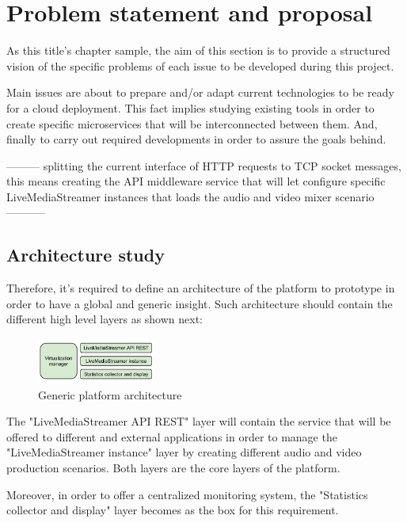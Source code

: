 \chapter{Problem statement and proposal}\label{B:problemStatementAndProposal}

As this title's chapter sample, the aim of this section is to provide a structured vision of the specific problems of each issue to be developed during this project.

Main issues are about to prepare and/or adapt current technologies to be ready for a cloud deployment. This fact implies studying existing tools in order to create specific microservices that will be interconnected between them. And, finally to carry out required developments in order to assure the goals behind.

--------- splitting the current interface of HTTP requests to TCP socket messages, this means creating the API middleware service that will let configure specific LiveMediaStreamer instances  that loads the audio and video mixer scenario-----------

\section{Architecture study}

Therefore, it's required to define an architecture of the platform to prototype in order to have a global and generic insight. Such architecture should contain the different high level layers as shown next:
\begin{figure}[htb]
\begin{center}
\includegraphics[width=0.35\textwidth]{./images/generalArch.png}
\caption{Generic platform architecture}
\label{F:genericPlatArch}
\end{center}
\end{figure}

The "LiveMediaStreamer API REST" layer will contain the service that will be offered to different and external applications in order to manage the "LiveMediaStreamer instance" layer by creating different audio and video production scenarios. Both layers are the core layers of the platform.

Moreover, in order to offer a centralized monitoring system, the "Statistics collector and display" layer becomes as the box for this requirement.


